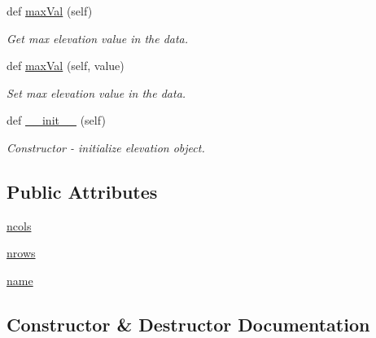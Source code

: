 \begin{DoxyCompactItemize}
def \hyperlink{classbridges_1_1data__src__dependent_1_1elevation_1_1_elevation_data_abf469228ae40204b0fd707c1055aaf12}{max\+Val} (self)
\begin{DoxyCompactList}\small\item\em Get max elevation value in the data. \end{DoxyCompactList}\item 
def \hyperlink{classbridges_1_1data__src__dependent_1_1elevation_1_1_elevation_data_a1abc78522ee0d919fe7064315396f99f}{max\+Val} (self, value)
\begin{DoxyCompactList}\small\item\em Set max elevation value in the data. \end{DoxyCompactList}\item 
def \hyperlink{classbridges_1_1data__src__dependent_1_1elevation_1_1_elevation_data_aab8384a1fddf6d5db3c7131a1a82659a}{\+\_\+\+\_\+init\+\_\+\+\_\+} (self)
\begin{DoxyCompactList}\small\item\em Constructor -\/ initialize elevation object. \end{DoxyCompactList}\end{DoxyCompactItemize}
\subsection*{Public Attributes}
\begin{DoxyCompactItemize}
\item 
\hyperlink{classbridges_1_1data__src__dependent_1_1elevation_1_1_elevation_data_a1eb3bae4754a50ce00cf1022a9562c08}{ncols}
\item 
\hyperlink{classbridges_1_1data__src__dependent_1_1elevation_1_1_elevation_data_adc326f6bc8eb64eaaa6d5a83c7094d60}{nrows}
\item 
\hyperlink{classbridges_1_1data__src__dependent_1_1elevation_1_1_elevation_data_a588604cbc8d38ecf8d3a87fac64251ac}{name}
\end{DoxyCompactItemize}


\subsection{Constructor \& Destructor Documentation}
\mbox{\label{classbridges_1_1data__src__dependent_1_1elevation_1_1_elevation_data_aab8384a1fddf6d5db3c7131a1a82659a}} 
